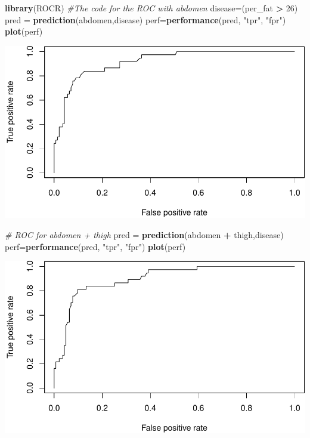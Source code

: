 \documentclass[]{article}
\newenvironment{Shaded}{\begin{snugshade}}{\end{snugshade}}
\newcommand{\KeywordTok}[1]{\textcolor[rgb]{0.13,0.29,0.53}{\textbf{#1}}}
\newcommand{\DecValTok}[1]{\textcolor[rgb]{0.00,0.00,0.81}{#1}}
\newcommand{\StringTok}[1]{\textcolor[rgb]{0.31,0.60,0.02}{#1}}
\newcommand{\CommentTok}[1]{\textcolor[rgb]{0.56,0.35,0.01}{\textit{#1}}}
\newcommand{\OperatorTok}[1]{\textcolor[rgb]{0.81,0.36,0.00}{\textbf{#1}}}
\newcommand{\NormalTok}[1]{#1}
\begin{document}
\begin{Shaded}
\begin{Highlighting}[]
\KeywordTok{library}\NormalTok{(ROCR)}
\CommentTok{#The code for the ROC with abdomen}
\NormalTok{disease=(per_fat }\OperatorTok{>}\StringTok{ }\DecValTok{26}\NormalTok{)}
\NormalTok{pred =}\StringTok{ }\KeywordTok{prediction}\NormalTok{(abdomen,disease)}
\NormalTok{perf=}\KeywordTok{performance}\NormalTok{(pred, }\StringTok{"tpr"}\NormalTok{, }\StringTok{"fpr"}\NormalTok{)}
\KeywordTok{plot}\NormalTok{(perf)}
\end{Highlighting}
\end{Shaded}

\includegraphics{BodyFat_files/figure-latex/unnamed-chunk-6-1.pdf}

\begin{Shaded}
\begin{Highlighting}[]
\CommentTok{# ROC for abdomen + thigh}
\NormalTok{pred =}\StringTok{ }\KeywordTok{prediction}\NormalTok{(abdomen }\OperatorTok{+}\StringTok{ }\NormalTok{thigh,disease) }
\NormalTok{perf=}\KeywordTok{performance}\NormalTok{(pred, }\StringTok{"tpr"}\NormalTok{, }\StringTok{"fpr"}\NormalTok{)}
\KeywordTok{plot}\NormalTok{(perf)}
\end{Highlighting}
\end{Shaded}

\includegraphics{BodyFat_files/figure-latex/unnamed-chunk-6-2.pdf}
\end{document}

